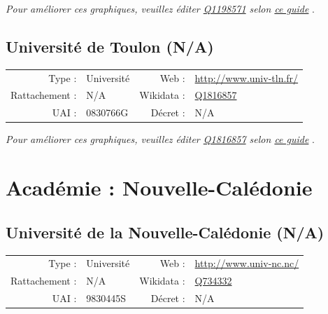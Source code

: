 \documentclass[12pt,french,landscape]{article}
\begin{document}
\textit{\scriptsize Pour améliorer ces graphiques, veuillez éditer \href{https://www.wikidata.org/entity/Q1198571}{Q1198571}  selon \href{https://github.com/cpesr/wikidataESR/blob/master/Rmd/wikidataESR.md}{ce guide}}
.


\newpage

\hypertarget{universituxe9-de-toulon-na}{%
\subsection{Université de Toulon
(N/A)}\label{universituxe9-de-toulon-na}}

\begin{tabular*}{0.45\textwidth}{rp{2cm}rl}  
\hline  
Type : & Université & Web : &\href{http://www.univ-tln.fr/}{http://www.univ-tln.fr/} \\  
Rattachement : & N/A & Wikidata : & \href{https://www.wikidata.org/entity/Q1816857}{Q1816857} \\  
UAI : & 0830766G & Décret : & N/A \\  
\hline  
\end{tabular*}

\textit{\scriptsize Pour améliorer ces graphiques, veuillez éditer \href{https://www.wikidata.org/entity/Q1816857}{Q1816857}  selon \href{https://github.com/cpesr/wikidataESR/blob/master/Rmd/wikidataESR.md}{ce guide}}
.


\newpage

\hypertarget{acaduxe9mie-nouvelle-caluxe9donie}{%
\section{Académie :
Nouvelle-Calédonie}\label{acaduxe9mie-nouvelle-caluxe9donie}}

\hypertarget{universituxe9-de-la-nouvelle-caluxe9donie-na}{%
\subsection{Université de la Nouvelle-Calédonie
(N/A)}\label{universituxe9-de-la-nouvelle-caluxe9donie-na}}

\begin{tabular*}{0.45\textwidth}{rp{2cm}rl}  
\hline  
Type : & Université & Web : &\href{http://www.univ-nc.nc/}{http://www.univ-nc.nc/} \\  
Rattachement : & N/A & Wikidata : & \href{https://www.wikidata.org/entity/Q734332}{Q734332} \\  
UAI : & 9830445S & Décret : & N/A \\  
\hline  
\end{tabular*}
\end{document}
